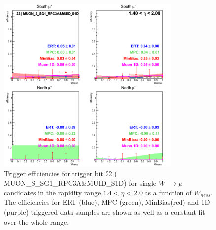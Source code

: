 \begin{figure}[h!]

  \centering

  \includegraphics[width=0.8\textwidth]{./figures/run13_trigeffisn_eta1_trig22_lin.png}
  \caption{\label{fig:run13_trigeffisn_eta1_nper0_trig22_lin} Trigger efficiencies for trigger bit 22 ( MUON\_S\_SG1\_RPC3A\&MUID\_S1D) for single $W$ $\rightarrow \mu$ candidates in the rapidity range $ 1.4 < \eta < 2.0$ as a function of $W_{ness}$. The efficiencies for ERT (blue), MPC (green), MinBias(red) and 1D (purple) triggered data samples are shown as well as a constant fit over the whole range.}

\end{figure}
\clearpage

